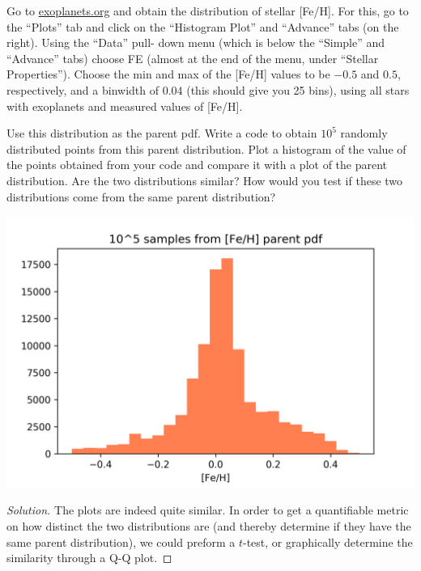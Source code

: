 \documentclass[10pt, physics]{homework}
\begin{document}
	\begin{problem}
		Go to \url{exoplanets.org} and obtain the distribution of stellar [Fe/H]. For this, go to the ``Plots'' tab and click on the “Histogram Plot” and ``Advance'' tabs (on the right). Using the ``Data'' pull- down menu (which is below the ``Simple'' and ``Advance'' tabs) choose FE (almost at the end of the menu, under “Stellar Properties”). Choose the min and max of the [Fe/H] values to be $-0.5$ and $0.5$, respectively, and a binwidth of $0.04$ (this should give you 25 bins), using all stars with exoplanets and measured values of [Fe/H].

		Use this distribution as the parent pdf. Write a code to obtain $10^5$ randomly distributed points from this parent distribution. Plot a histogram of the value of the points obtained from your code and compare it with a plot of the parent distribution. Are the two distributions similar? How would you test if these two distributions come from the same parent distribution?
	\end{problem}
	\includegraphics[width=\textwidth]{2}
	\begin{proof}[Solution]
		The plots are indeed quite similar.
		In order to get a quantifiable metric on how distinct the two distributions are (and thereby determine if they have the same parent distribution), we could preform a $t$-test, or graphically determine the similarity through a Q-Q plot.
	\end{proof}
\end{document}

